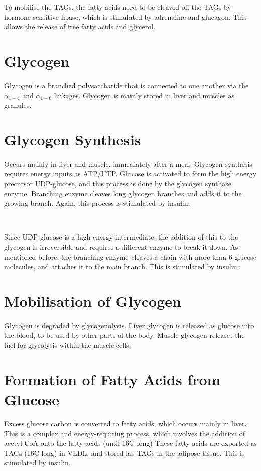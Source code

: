 To mobilise the TAGs, the fatty acids need to be cleaved off the TAGs by hormone sensitive lipase, which is stimulated by adrenaline and glucagon.
This allows the release of free fatty acids and glycerol.

\section{Glycogen}

Glycogen is a branched polysaccharide that is connected to one another via the $\alpha_{1-4}$ and $\alpha_{1-6}$ linkages.
Glycogen is mainly stored in liver and muscles as granules.

\section{Glycogen Synthesis}

Occurs mainly in liver and muscle, immediately after a meal.
Glycogen synthesis requires energy inputs as ATP/UTP.
Glucose is activated to form the high energy precursor UDP-glucose, and this process is done by the glycogen synthase enzyme.
Branching enzyme cleaves long glycogen branches and adds it to the growing branch.
Again, this process is stimulated by insulin.

\begin{center}
\\
\end{center}

Since UDP-glucose is a high energy intermediate, the addition of this to the glycogen is irreversible and requires a different enzyme to break it down.
As mentioned before, the branching enzyme cleaves a chain with more than 6 glucose molecules, and attaches it to the main branch.
This is stimulated by insulin.

\section{Mobilisation of Glycogen}

Glycogen is degraded by glycogenolysis.
Liver glycogen is released as glucose into the blood, to be used by other parts of the body.
Muscle glycogen releases the fuel for glycolysis within the muscle cells.

\section{Formation of Fatty Acids from Glucose}

Excess glucose carbon is converted to fatty acids, which occurs mainly in liver.
This is a complex and energy-requiring process, which involves the addition of acetyl-CoA onto the fatty acids (until 16C long)
These fatty acids are exported as TAGs (16C long) in VLDL, and stored las TAGs in the adipose tissue.
This is stimulated by insulin.

